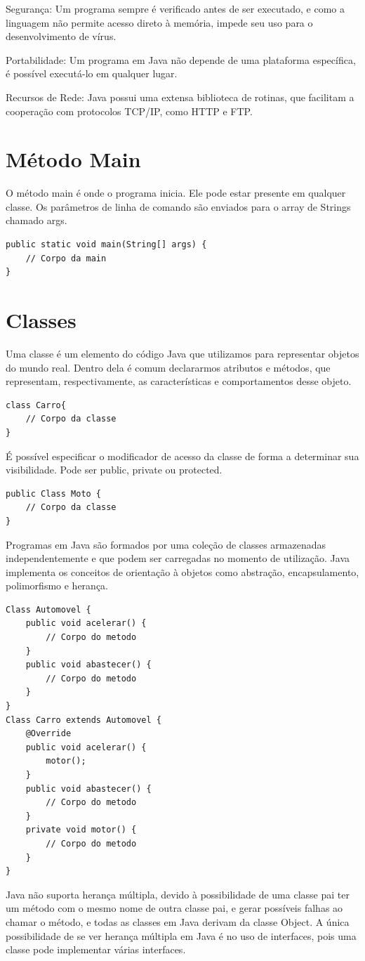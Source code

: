 \documentclass[
	12pt,				%
	openright,			%
	oneside,			%
	a4paper,			%
	english,			%
	french,				%
	spanish,			%
	brazil				%
	]{abntex2}
\begin{document}
Segurança: Um programa sempre é verificado antes de ser executado, e como a
linguagem não permite acesso direto à memória, impede seu uso para o desenvolvimento
de vírus.

Portabilidade: Um programa em Java não depende de uma plataforma específica, é
possível executá-lo em qualquer lugar.

Recursos de Rede: Java possui uma extensa biblioteca de rotinas, que facilitam a
cooperação com protocolos TCP/IP, como HTTP e FTP.

\section{Método Main}
O método main é onde o programa inicia. Ele pode estar presente em qualquer classe.
Os parâmetros de linha de comando são enviados para o array de Strings chamado args.

\begin{lstlisting}
public static void main(String[] args) {
	// Corpo da main
}
\end{lstlisting}
\section{Classes}

Uma classe é um elemento do código Java que utilizamos para representar objetos
do mundo real. Dentro dela é comum declararmos atributos e métodos, que representam,
respectivamente, as características e comportamentos desse objeto.

\begin{lstlisting}
class Carro{ 
	// Corpo da classe
}
\end{lstlisting}

É possível especificar o modificador de acesso da classe de forma a determinar sua
visibilidade. Pode ser public, private ou protected.

\begin{lstlisting}
public Class Moto {
	// Corpo da classe
}
\end{lstlisting}

Programas em Java são formados por uma coleção de classes armazenadas
independentemente e que podem ser carregadas no momento de utilização.
Java implementa os conceitos de orientação à objetos como abstração,
encapsulamento, polimorfismo e herança.

\begin{lstlisting}
Class Automovel {
	public void acelerar() {
		// Corpo do metodo
	}
	public void abastecer() {
		// Corpo do metodo
	}
}
Class Carro extends Automovel {
	@Override
	public void acelerar() {
		motor();
	}
	public void abastecer() {
		// Corpo do metodo
	}
	private void motor() {
		// Corpo do metodo
	}
}
\end{lstlisting}
Java não suporta herança múltipla, devido à possibilidade de uma classe pai ter um
método com o mesmo nome de outra classe pai, e gerar possíveis falhas ao chamar o
método, e todas as classes em Java derivam da classe Object. A única possibilidade de se
ver herança múltipla em Java é no uso de interfaces, pois uma classe pode implementar
várias interfaces.
\end{document}
